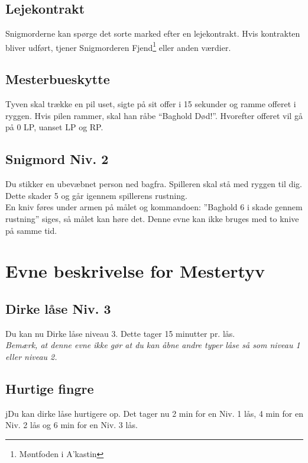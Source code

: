 


\subsection{Lejekontrakt}
Snigmorderne kan spørge det sorte marked efter en lejekontrakt. Hvis kontrakten
bliver udført, tjener Snigmorderen Fjend\footnote{Møntfoden i A'kastin} eller anden værdier.\\

\subsection{Mesterbueskytte}
Tyven skal trække en pil uset, sigte på sit offer i 15 sekunder og ramme offeret i ryggen. Hvis pilen rammer, skal han råbe “Baghold Død!”. Hvorefter offeret vil gå på 0 LP, uanset LP og RP.\\

\subsection{Snigmord Niv. 2}
Du stikker en ubevæbnet person ned bagfra. Spilleren skal stå med ryggen til dig. Dette skader 5 og går igennem spillerens rustning.\\ 
En kniv føres under armen på målet og kommandoen: ”Baghold 6 i skade gennem rustning” siges, så målet kan høre det. Denne evne kan ikke bruges med to knive på samme tid.\\

\section{Evne beskrivelse for Mestertyv}

\subsection{Dirke låse Niv. 3}
Du kan nu Dirke låse niveau 3. Dette tager 15 minutter pr. lås.\\
\emph{Bemærk, at denne evne ikke gør at du kan åbne andre typer låse så som niveau 1 eller niveau 2.}\\

\subsection{Hurtige fingre}
jDu kan dirke låse hurtigere op. Det tager nu 2 min for en Niv. 1 lås, 4 min for en Niv. 2 lås og 6 min for en Niv. 3 lås.\\

